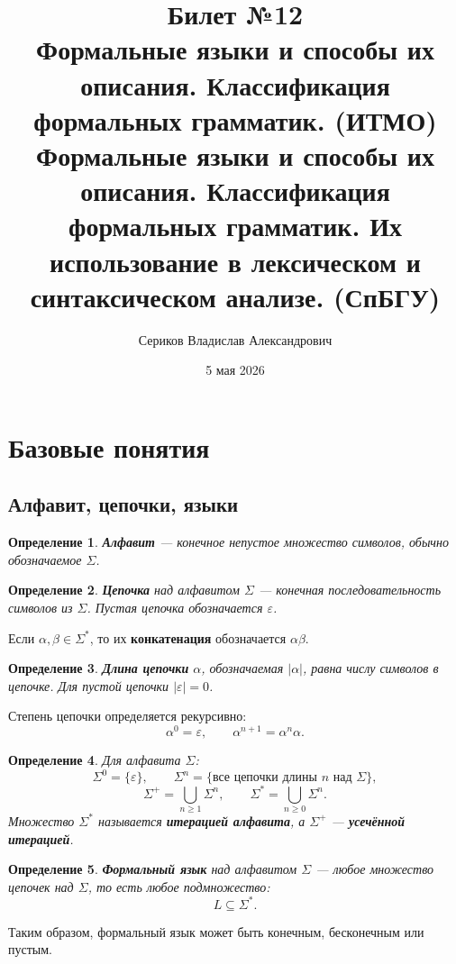 \documentclass[12pt,a4paper]{article}
\title{Билет №12 \\ \small Формальные языки и способы их описания. Классификация формальных грамматик. (ИТМО) \\ Формальные языки и способы их описания. Классификация формальных грамматик. Их использование в лексическом и синтаксическом анализе. (СпБГУ)}
\author{Сериков Владислав Александрович}
\date{5 мая 2026}
\newtheorem{definition}{Определение}
\newcommand{\eps}{\varepsilon}
\begin{document}
\maketitle
\tableofcontents
\newpage

\section{Базовые понятия}

\subsection{Алфавит, цепочки, языки}

\begin{definition}
\textbf{Алфавит} --- конечное непустое множество символов, обычно обозначаемое $\Sigma$.
\end{definition}

\begin{definition}
\textbf{Цепочка} над алфавитом $\Sigma$ --- конечная последовательность символов из $\Sigma$.
Пустая цепочка обозначается $\eps$.
\end{definition}

Если $\alpha,\beta \in \Sigma^*$, то их \textbf{конкатенация} обозначается $\alpha\beta$.

\begin{definition}
\textbf{Длина цепочки} $\alpha$, обозначаемая $|\alpha|$, равна числу символов в цепочке.
Для пустой цепочки $|\eps|=0$.
\end{definition}

Степень цепочки определяется рекурсивно:
\[
\alpha^0=\eps,\qquad \alpha^{n+1}=\alpha^n\alpha.
\]

\begin{definition}
Для алфавита $\Sigma$:
\[
\Sigma^0=\{\eps\}, \qquad
\Sigma^n=\{\text{все цепочки длины } n \text{ над } \Sigma\},
\]
\[
\Sigma^+=\bigcup_{n\ge 1}\Sigma^n,\qquad
\Sigma^*=\bigcup_{n\ge 0}\Sigma^n.
\]
Множество $\Sigma^*$ называется \textbf{итерацией алфавита}, а $\Sigma^+$ --- \textbf{усечённой итерацией}.
\end{definition}

\begin{definition}
\textbf{Формальный язык} над алфавитом $\Sigma$ --- любое множество цепочек над $\Sigma$, то есть любое подмножество:
\[
L\subseteq \Sigma^*.
\]
\end{definition}

Таким образом, формальный язык может быть конечным, бесконечным или пустым.
\end{document}
